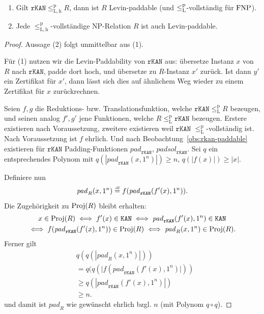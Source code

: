 \begin{lemma}\label{obs:invcomplete-sind-levinpaddable}
    \begin{enumerate}
        \item Gilt $\mathtt{rKAN}\leq_\mathrm{L,h}^\mathrm{p} R$, dann ist $R$ Levin-paddable (und $\leq_\mathrm{L}^\mathrm{p}$-vollständig für $\mathrm{FNP}$).
        \item Jede $\leq_\mathrm{L,h}^\mathrm{p}$-vollständige NP-Relation $R$ ist auch Levin-paddable.
    \end{enumerate}
\end{lemma}
\begin{proof}
    Aussage (2) folgt unmittelbar aus (1).

    Für (1) nutzen wir die Levin-Paddability von $\mathtt{rKAN}$ aus: übersetze Instanz $x$ von $R$ nach $\mathtt{rKAN}$, padde dort hoch, und übersetze zu $R$-Instanz $x'$ zurück. Ist dann $y'$ ein Zertifikat für $x'$, dann lässt sich dies auf ähnlichem Weg wieder zu einem Zertifikat für $x$ zurückrechnen.

    Seien $f, g$ die Reduktions- bzw. Translationsfunktion, welche $\mathtt{rKAN}\leq_\mathrm{L}^\mathrm p R$ bezeugen, und seinen analog $f', g'$ jene Funktionen, welche $R\leq_\mathrm{L}^\mathrm p \mathtt{rKAN}$ bezeugen. Erstere existieren nach Voraussetzung, zweitere existieren weil $\mathtt{rKAN}$ $\leq_\mathrm{L}^\mathrm p$-vollständig ist.
    Nach Voraussetzung ist $f$ ehrlich. %
    Und nach Beobachtung~\ref{obs:rkan-paddable} existieren für $\mathtt{rKAN}$ Padding-Funktionen $\mathit{pad}_\mathtt{rKAN}$, $\mathit{padsol}_\mathtt{rKAN}$.
    Sei $q$ ein entsprechendes Polynom mit $q(|\mathit{pad}_\mathtt{rKAN}(x, 1^n)|)\geq n$, $q(|f(x)|) \geq |x|$.

    Definiere nun
    \[ \mathit{pad}_R(x, 1^n) \stackrel{\text{\smash{\normalfont\tiny df}}}{=}  f(\mathit{pad}_\mathtt{rKAN}(f'(x), 1^n)). \]
    Die Zugehörigkeit zu $\operatorname{Proj}(R)$ bleibt erhalten:
    \begin{gather*}
        x\in \operatorname{Proj}(R) \iff f'(x) \in \mathtt{KAN} \iff \mathit{pad}_\mathtt{rKAN}(f'(x), 1^n) \in \mathtt{KAN}\\ \iff f(\mathit{pad}_\mathtt{rKAN}(f'(x), 1^n)) \in \operatorname{Proj}(R) \iff \mathit{pad}_R(x, 1^n) \in\operatorname{Proj}(R).
    \end{gather*}
    Ferner gilt
    \begin{align*} &q(q(|\mathit{pad}_R(x, 1^n)|)) \\&= q(q(|f(\mathit{pad}_\mathtt{rKAN}(f'(x), 1^n)|))\\&\geq q(|\mathit{pad}_\mathtt{rKAN}(f'(x), 1^n)|)\\ &\geq n.
    \end{align*}
    und damit ist $\mathit{pad}_R$ wie gewünscht ehrlich bzgl. $n$ (mit Polynom $q\circ q$).


\end{proof}
